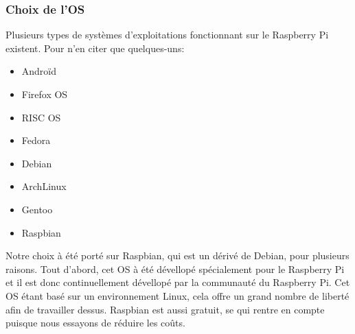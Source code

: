 \documentclass[a4paper,12pt]{article}
\begin{document}
{\subsubsection*{Choix de l'OS}
Plusieurs types de systèmes d'exploitations fonctionnant sur le Raspberry Pi existent. Pour n'en citer que quelques-uns:
\begin{multicols}{2}
\begin{itemize}
\item Androïd
\item Firefox OS
\item RISC OS
\item Fedora
\item Debian
\item ArchLinux
\item Gentoo
\item Raspbian
\end{itemize}
\end{multicols}
Notre choix à été porté sur Raspbian, qui est un dérivé de Debian, pour plusieurs raisons. Tout d'abord, cet OS à été dévellopé spécialement pour le Raspberry Pi et il est donc continuellement dévellopé par la communauté du Raspberry Pi. Cet OS étant basé sur un environnement Linux, cela offre un grand nombre de liberté afin de travailler dessus. Raspbian est aussi gratuit, se qui rentre en compte puisque nous essayons de réduire les coûts.  







}
\end{document}
